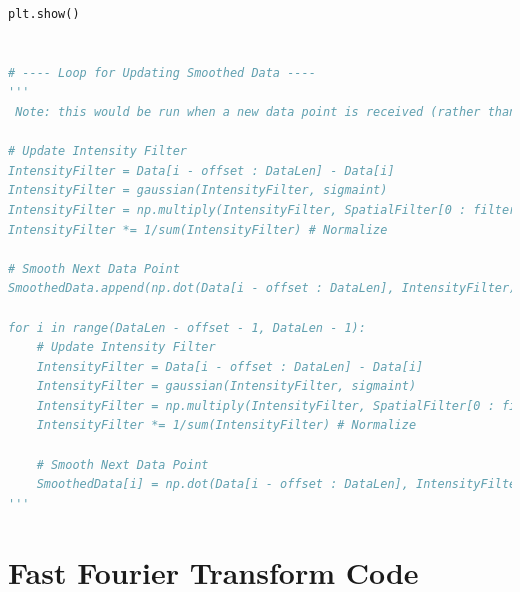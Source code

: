 \documentclass[11pt]{article}
\theoremstyle{definition}
\begin{document}
\begin{lstlisting}[language = Python]
plt.show()


# ---- Loop for Updating Smoothed Data ----
'''
 Note: this would be run when a new data point is received (rather than re-running the whole function for all data)

# Update Intensity Filter
IntensityFilter = Data[i - offset : DataLen] - Data[i]
IntensityFilter = gaussian(IntensityFilter, sigmaint)
IntensityFilter = np.multiply(IntensityFilter, SpatialFilter[0 : filtersize - (i - DataLen + offset) - 1])
IntensityFilter *= 1/sum(IntensityFilter) # Normalize

# Smooth Next Data Point
SmoothedData.append(np.dot(Data[i - offset : DataLen], IntensityFilter)

for i in range(DataLen - offset - 1, DataLen - 1):
    # Update Intensity Filter
    IntensityFilter = Data[i - offset : DataLen] - Data[i]
    IntensityFilter = gaussian(IntensityFilter, sigmaint)
    IntensityFilter = np.multiply(IntensityFilter, SpatialFilter[0 : filtersize - (i - DataLen - 1 + offset) - 1])
    IntensityFilter *= 1/sum(IntensityFilter) # Normalize

    # Smooth Next Data Point
    SmoothedData[i] = np.dot(Data[i - offset : DataLen], IntensityFilter)
'''

\end{lstlisting}

\pagebreak

\section{Fast Fourier Transform Code}
\end{document}
